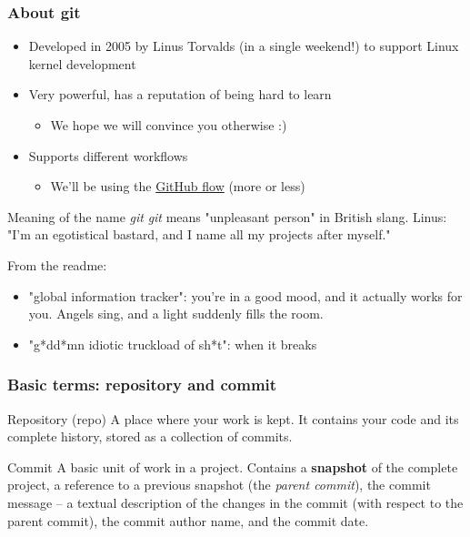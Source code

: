 \begin{frame}

\frametitle{About git}
	
\begin{itemize}
	\item Developed in 2005 by Linus Torvalds (in a single weekend!) to support Linux kernel development
	\item Very powerful, has a reputation of being hard to learn
	\begin{itemize}
	\item We hope we will convince you otherwise :)
	\end{itemize}
	\item Supports different workflows
	\begin{itemize}
	\item We'll be using the \href{https://guides.github.com/introduction/flow/}{GitHub flow} (more or less)	
	\end{itemize}
\end{itemize}

\begin{block}{Meaning of the name \emph{git}}
\small
\emph{git} means "unpleasant person" in British slang. Linus: "I'm an egotistical bastard, and I name all my projects after myself."

\medskip
From the readme:
	 \begin{itemize}
	 \item "global information tracker": you're in a good mood, and it actually works for you. Angels sing, and a light suddenly fills the room.
	 \item "g*dd*mn idiotic truckload of sh*t": when it breaks
	 \end{itemize}
	 
\end{block}

\end{frame}


\begin{frame}

\frametitle{Basic terms: repository and commit}
\begin{block}{Repository (repo)}
	A place where your work is kept. It contains your code and its complete history, stored as a collection of commits.
\end{block}

\begin{block}{Commit}
	A basic unit of work in a project. Contains a \textbf{snapshot} of the complete project, a reference to a previous snapshot (the \textit{parent commit}), the commit message -- a textual description of the changes in the commit (with respect to the parent commit), the commit author name, and the commit date.
\end{block}	
\end{frame}

